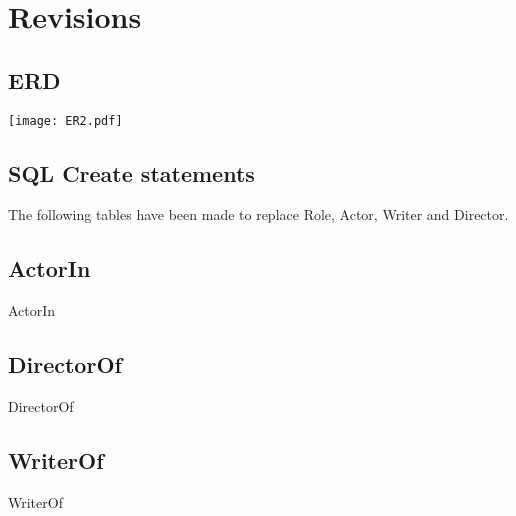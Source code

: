 \section{Revisions}

\subsection{ERD}
\texttt{[image: ER2.pdf]}

\subsection{SQL Create statements}
The following tables have been made to replace Role, Actor, Writer and Director.

\subsection*{ActorIn}
\begin{createSQL}{ActorIn}
\end{createSQL}

\subsection*{DirectorOf}
\begin{createSQL}{DirectorOf}
\end{createSQL}

\subsection*{WriterOf}
\begin{createSQL}{WriterOf}
\end{createSQL}